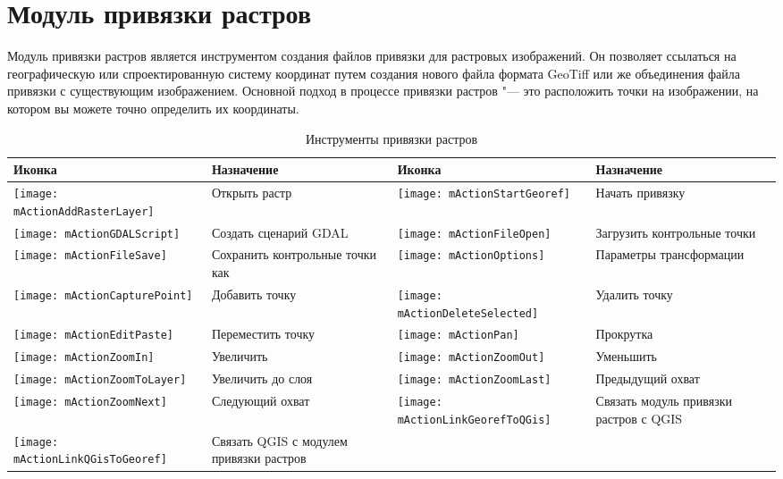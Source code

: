 
\section{Модуль привязки растров}


Модуль привязки растров является инструментом создания файлов привязки
для растровых изображений. Он позволяет ссылаться на географическую или
спроектированную систему координат путем создания нового файла формата
GeoTiff или же объединения файла привязки с существующим изображением.
Основной подход в процессе привязки растров "--- это расположить точки на
изображении, на котором вы можете точно определить их координаты.


\begin{table}[h]
\begin{tabular}{|m{1cm}|m{6cm}|m{1cm}|m{6cm}|}
 \hline \textbf{Иконка} & \textbf{Назначение} & \textbf{Иконка} &
 \textbf{Назначение} \\
 \hline \texttt{[image: mActionAddRasterLayer]} & Открыть растр &
 \texttt{[image: mActionStartGeoref]} & Начать привязку \\
 \hline \texttt{[image: mActionGDALScript]} & Создать сценарий GDAL &
 \texttt{[image: mActionFileOpen]} & Загрузить контрольные точки \\
 \hline \texttt{[image: mActionFileSave]} & Сохранить контрольные точки как &
 \texttt{[image: mActionOptions]} & Параметры трансформации \\
 \hline \texttt{[image: mActionCapturePoint]} & Добавить точку &
 \texttt{[image: mActionDeleteSelected]} & Удалить точку \\
 \hline \texttt{[image: mActionEditPaste]} & Переместить точку &
 \texttt{[image: mActionPan]} & Прокрутка \\
 \hline \texttt{[image: mActionZoomIn]} & Увеличить &
 \texttt{[image: mActionZoomOut]} & Уменьшить \\
 \hline \texttt{[image: mActionZoomToLayer]} & Увеличить до слоя &
 \texttt{[image: mActionZoomLast]} & Предыдущий охват \\
 \hline \texttt{[image: mActionZoomNext]} & Следующий охват &
 \texttt{[image: mActionLinkGeorefToQGis]} & Связать модуль привязки растров с QGIS \\
 \hline \texttt{[image: mActionLinkQGisToGeoref]} & Связать QGIS с модулем привязки растров &
 &  \\
\hline
\end{tabular}
\caption{Инструменты привязки растров}\label{tab:georeferencer_tools}
\end{table}

